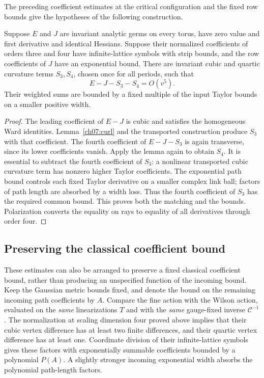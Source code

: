 The preceding coefficient estimates at the critical configuration and the fixed row bounds
give the hypotheses of the following construction.

\begin{proposition}
\label{ch07:classical-match}
Suppose $E$ and $J$ are invariant analytic germs on every torus, have
zero value and first derivative and identical Hessians. Suppose their
normalized coefficients of orders three and four have infinite-lattice symbols with strip
bounds, and the row coefficients of $J$ have an exponential bound.
There are invariant cubic and quartic curvature terms $S_3,S_4$, chosen
once for all periods, such that
\[
 E-J-S_3-S_4=O(v^5).
\]
Their weighted sums are bounded by a fixed multiple of the input Taylor
bounds on a smaller positive width.
\end{proposition}

\begin{proof}
The leading coefficient of $E-J$ is cubic and satisfies the homogeneous
Ward identities. Lemma~\ref{ch07:curl} and the transported construction
produce $S_3$ with that coefficient. The fourth coefficient of
$E-J-S_3$ is again transverse, since its lower coefficients vanish.
Apply the lemma again to obtain $S_4$. It is essential to subtract the
fourth coefficient of $S_3$: a nonlinear transported cubic curvature
term has nonzero higher Taylor coefficients. The exponential path
bound controls each fixed Taylor derivative on a smaller complex link
ball; factors of path length are absorbed by a width loss. Thus the
fourth coefficient of $S_3$ has the required common bound. This proves
both the matching and the bounds. Polarization converts the equality on
rays to equality of all derivatives through order four.
\end{proof}

\subsection{Preserving the classical coefficient bound}

These estimates can also be arranged to preserve a fixed classical
coefficient bound, rather than producing an unspecified function of the
incoming bound. Keep the Gaussian metric bounds fixed, and denote the
bound on the remaining incoming path coefficients by $A$. Compare the
fine action with the Wilson action, evaluated on the \emph{same}
linearizations $T$ and with the \emph{same} gauge-fixed inverse $\mathscr C^{-1}$.
The normalization at scaling dimension four proved above implies that their cubic
vertex difference has at least two finite differences, and their
quartic vertex difference has at least one. Coordinate division of their
infinite-lattice symbols gives these factors with exponentially summable
coefficients bounded by a polynomial $P(A)$. A slightly stronger incoming
exponential width absorbs the polynomial path-length factors.


